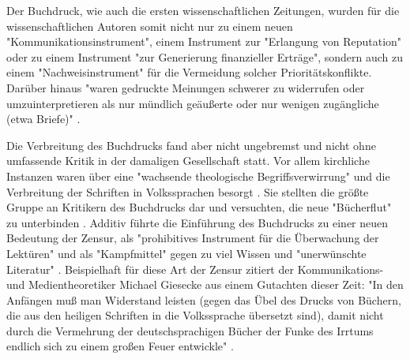 Der Buchdruck, wie auch die ersten wissenschaftlichen Zeitungen, wurden für die wissenschaftlichen Autoren somit nicht nur zu einem neuen "Kommunikationsinstrument", einem Instrument zur "Erlangung von Reputation" oder zu einem Instrument "zur Generierung finanzieller Erträge", sondern auch zu einem "Nachweisinstrument" \cite{wunderlich_2008_buchdruck} \cite{schirmbacher_2009_wisspub} für die Vermeidung solcher Prioritätskonflikte. Darüber hinaus "waren gedruckte Meinungen schwerer zu widerrufen oder umzuinterpretieren als nur mündlich geäußerte oder nur wenigen zugängliche (etwa Briefe)" \cite{luhmann_1997_gesellschaft}.

Die Verbreitung des Buchdrucks fand aber nicht ungebremst und nicht ohne umfassende Kritik in der damaligen Gesellschaft statt. Vor allem kirchliche Instanzen waren über eine "wachsende theologische Begriffsverwirrung" und die Verbreitung der Schriften in Volkssprachen besorgt \cite{giesecke_1991_buchdruck}. Sie stellten die größte Gruppe an Kritikern des Buchdrucks dar und versuchten, die neue "Bücherflut" zu unterbinden \cite{giesecke_1991_buchdruck}. Additiv führte die Einführung des Buchdrucks zu einer neuen Bedeutung der Zensur, als "prohibitives Instrument für die Überwachung der Lektüren" und als "Kampfmittel" \cite{sprachgeschichte_1998_besch} gegen zu viel Wissen \cite{suchen} und "unerwünschte Literatur" \cite{suchen}. Beispielhaft für diese Art der Zensur zitiert der Kommunikations- und Medientheoretiker Michael Giesecke aus einem Gutachten dieser Zeit: "In den Anfängen muß man Widerstand leisten (gegen das Übel des Drucks von Büchern, die aus den heiligen Schriften in die Volkssprache übersetzt sind), damit nicht durch die Vermehrung der deutschsprachigen Bücher der Funke des Irrtums endlich sich zu einem großen Feuer entwickle" \cite{giesecke_1991_buchdruck}.

